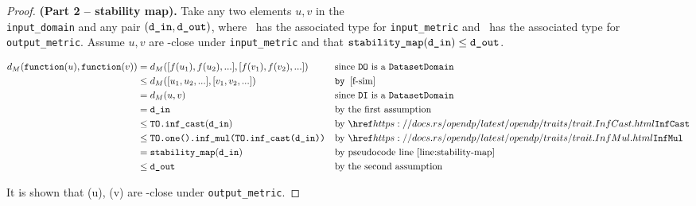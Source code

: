 \documentclass{article}
\begin{document}
\begin{proof} \textbf{(Part 2 -- stability map).}
    Take any two elements $u, v$ in the \\\texttt{input\_domain} and any pair $(\texttt{d\_in}, \texttt{d\_out})$,
    where \din\ has the associated type for \texttt{input\_metric} and \dout\ has the associated type for \texttt{output\_metric}.
    Assume $u, v$ are \din-close under \texttt{input\_metric} and that $\texttt{stability\_map}(\texttt{d\_in}) \leq \texttt{d\_out}$.

    \begin{align*}
        d_{M}(\function(u), \function(v)) &= d_{M}([f(u_1), f(u_2), ...], [f(v_1), f(v_2), ...])  && \text{since \texttt{DO} is a }\texttt{DatasetDomain}\\
        &\le d_{M}([u_1, u_2, ...], [v_1, v_2, ...]) && \texttt{by } \ref{f-sim} \\
        &= d_{M}(u, v)  && \text{since \texttt{DI} is a }\texttt{DatasetDomain} \\
        &= \din &&\text{by the first assumption} \\
        &\leq \texttt{TO.inf\_cast}(\din) &&\text{by } \rustdoc{traits/trait}{InfCast} \\
        &\leq \texttt{TO.one().inf\_mul(TO.inf\_cast(\din))} &&\text{by } \rustdoc{traits/trait}{InfMul} \\
        &=\texttt{stability\_map}(\din) &&\text{by pseudocode line } \ref{line:stability-map} \\
        &\leq \dout &&\text{by the second assumption}
    \end{align*}

    It is shown that \function(u), \function(v) are \dout-close under \texttt{output\_metric}.
\end{proof}
\end{document}
